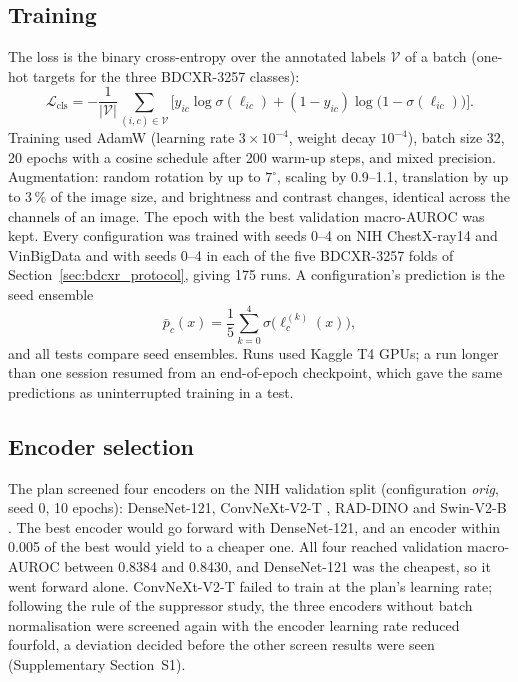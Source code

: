 \subsection{Training}
The loss is the binary cross-entropy over the annotated labels $\mathcal{V}$ of a batch (one-hot targets for the three BDCXR-3257 classes):
\begin{equation}
\mathcal{L}_{\mathrm{cls}}=-\frac{1}{|\mathcal{V}|}\sum_{(i,c)\in\mathcal{V}}\Big[y_{ic}\log\sigma(\ell_{ic})+(1-y_{ic})\log\big(1-\sigma(\ell_{ic})\big)\Big].
\label{eq:bce}
\end{equation}
Training used AdamW \citep{loshchilov2019adamw} (learning rate $3\times10^{-4}$, weight decay $10^{-4}$), batch size 32, 20 epochs with a cosine
schedule after 200 warm-up steps, and mixed precision. Augmentation: random rotation by up to $7^\circ$, scaling by 0.9--1.1, translation by up to
3\,\% of the image size, and brightness and contrast changes, identical across the channels of an image. The epoch with the best validation
macro-AUROC was kept. Every configuration was trained with seeds 0--4 on NIH ChestX-ray14 and VinBigData and with seeds 0--4 in each of the five
BDCXR-3257 folds of Section~\ref{sec:bdcxr_protocol}, giving 175 runs. A configuration's prediction is the seed ensemble
\begin{equation}
\bar p_c(x)=\frac15\sum_{k=0}^{4}\sigma\big(\ell^{(k)}_c(x)\big),
\label{eq:seedens}
\end{equation}
and all tests compare seed ensembles. Runs used Kaggle T4 GPUs; a run longer than one session resumed from an end-of-epoch checkpoint, which gave
the same predictions as uninterrupted training in a test.

\subsection{Encoder selection}
The plan screened four encoders on the NIH validation split (configuration \emph{orig}, seed 0, 10 epochs): DenseNet-121, ConvNeXt-V2-T
\citep{woo2023convnextv2}, RAD-DINO \citep{perezgarcia2025raddino} and Swin-V2-B \citep{liu2022swinv2}. The best encoder would go forward
with DenseNet-121, and an encoder within 0.005 of the best would yield to a cheaper one. All four reached validation macro-AUROC between
0.8384 and 0.8430, and DenseNet-121 was the cheapest, so it went forward alone. ConvNeXt-V2-T failed to train at the plan's learning rate;
following the rule of the suppressor study, the three encoders without batch normalisation were screened again with the encoder learning rate
reduced fourfold, a deviation decided before the other screen results were seen (Supplementary Section~S1).

